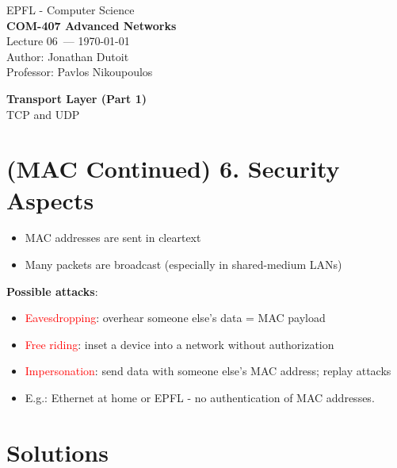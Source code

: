\documentclass[11pt]{article}
\newcommand{\coursename}{COM-407 Advanced Networks}
\newcommand{\lecturenum}{06}
\newcommand{\lecturedate}{\today}
\newcommand{\professor}{Pavlos Nikoupoulos}
\begin{document}
\begin{center}
  {\large EPFL - Computer Science} \\[0.5em]
  {\Large \textbf{\coursename}} \\[0.5em]
  {\large Lecture \lecturenum\ --- \lecturedate} \\[0.5em]
  {\large Author: Jonathan Dutoit} \\[0.5em]
  {\large Professor: \professor} \\[0.5em]
\end{center}

\vspace{2cm}

\begin{center}
  {\LARGE \textbf{Transport Layer (Part 1)}} \\
  TCP and UDP
\end{center}

\vspace{1cm}

\section*{(MAC Continued) 6. Security Aspects}
\begin{itemize}
	\item MAC addresses are sent in cleartext
	\item Many packets are broadcast (especially in shared-medium LANs)
\end{itemize}

\textbf{Possible attacks}: 
\begin{itemize}
	\item \textcolor{red}{Eavesdropping}: overhear someone else's data = MAC payload
	\item \textcolor{red}{Free riding}: inset a device into a network without authorization
	\item \textcolor{red}{Impersonation}: send data with someone else's MAC address; replay attacks
\end{itemize}

\begin{itemize}
	\item E.g.: Ethernet at home or EPFL - no authentication of MAC addresses. 
\end{itemize}

\section*{Solutions}
\end{document}
